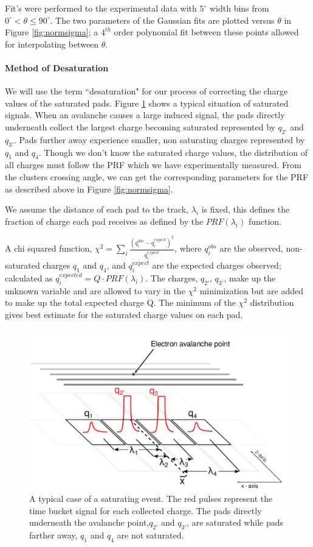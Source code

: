 \documentclass[review]{elsarticle}
\begin{document}
Fit's were performed to the experimental data with  $5^{\circ}$ width bins from $0^{\circ} < \theta \leq 90^{\circ}$. The two parameters of the Gaussian fits are plotted versus $\theta$ in Figure \ref{fig:normsigma}; a $4^{th}$ order polynomial fit between these points allowed for interpolating between $\theta$.

\paragraph{Method of Desaturation}
We will use the term ``desaturation" for our process of correcting the charge values of the saturated pads. Figure \ref{fig:satpad} shows a typical situation of saturated signals. When an avalanche causes a large induced signal, the pads directly underneath collect the largest charge becoming saturated represented by $q_{2'}$ and $q_{3'}$. Pads further away experience smaller, non saturating charges represented by  $q_{1}$ and $q_{4}$. Though we don't know the saturated charge values, the distribution of all charges must follow the PRF which we have experimentally measured. From the clusters crossing angle, we can get the corresponding parameters for the PRF as described above in Figure \ref{fig:normsigma}.

We assume the distance of each pad to the track, $\lambda_i$ is fixed, this defines the fraction of charge each pad receives as defined by the $PRF(\lambda_i)$ function. 

A chi squared function, $\chi^2 = \sum_i \frac{(q_i^{obs} - q_i^{expect})^2}{q_i^{expect}}$, where $q_i^{obs}$ are the observed, non-saturated charges $q_{1}$ and $q_{4}$, and $q_i^{expect}$ are the expected charges observed; calculated as $ q_i^{expected} = Q\cdot PRF(\lambda_i)$. The charges, $q_{2'}$, $q_{3'}$, make up the unknown variable and are allowed to vary in the $\chi^2$ minimization but are added to make up the total expected charge Q. The minimum of the $\chi^2$ distribution gives best estimate for the saturated charge values on each pad. 


\begin{figure}[H]
\includegraphics[width=\linewidth]{saturated_pads}
\caption{A typical case of a saturating event. The red pulses represent the time bucket signal for each collected charge. The pads directly underneath the avalanche point,$q_{2'}$ and $q_{3'}$, are saturated while pads farther away, $q_1$ and $q_4$ are not saturated.}
\label{fig:satpad}
\end{figure}
\end{document}

